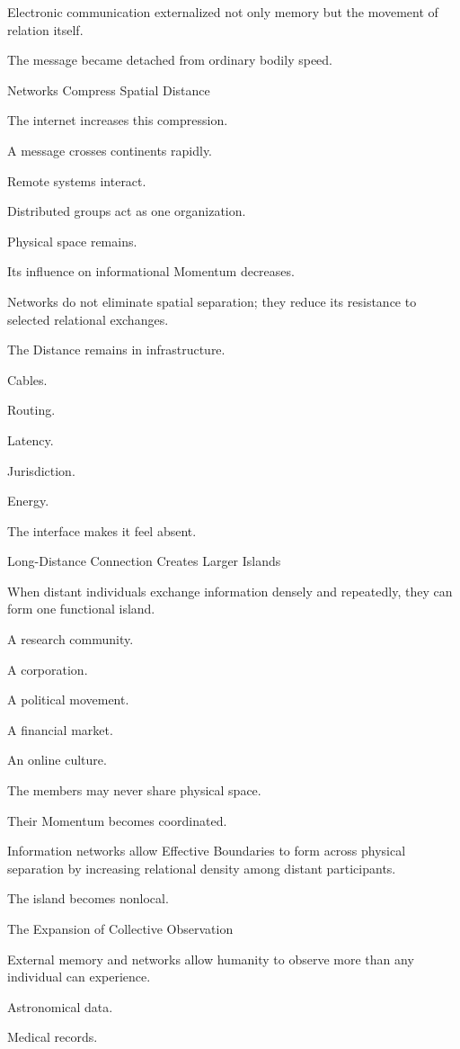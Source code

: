 Electronic communication externalized not only memory but the movement of relation itself.

The message became detached from ordinary bodily speed.

Networks Compress Spatial Distance

The internet increases this compression.

A message crosses continents rapidly.

Remote systems interact.

Distributed groups act as one organization.

Physical space remains.

Its influence on informational Momentum decreases.

Networks do not eliminate spatial separation; they reduce its resistance to selected relational exchanges.

The Distance remains in infrastructure.

Cables.

Routing.

Latency.

Jurisdiction.

Energy.

The interface makes it feel absent.

Long-Distance Connection Creates Larger Islands

When distant individuals exchange information densely and repeatedly, they can form one functional island.

A research community.

A corporation.

A political movement.

A financial market.

An online culture.

The members may never share physical space.

Their Momentum becomes coordinated.

Information networks allow Effective Boundaries to form across physical separation by increasing relational density among distant participants.

The island becomes nonlocal.

The Expansion of Collective Observation

External memory and networks allow humanity to observe more than any individual can experience.

Astronomical data.

Medical records.

